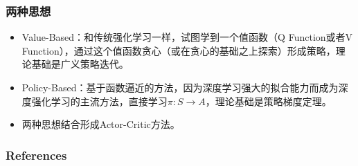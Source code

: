 \documentclass[aspectratio=169]{beamer}
\begin{document}
\begin{frame}
  \frametitle{两种思想}
  \begin{itemize}
    \item Value-Based：和传统强化学习一样，试图学到一个值函数（Q Function或者V Function），通过这个值函数贪心（或在贪心的基础之上探索）形成策略，理论基础是广义策略迭代。
    \item Policy-Based：基于函数逼近的方法，因为深度学习强大的拟合能力而成为深度强化学习的主流方法，直接学习$\pi:S \rightarrow A$，理论基础是策略梯度定理。
    \item 两种思想结合形成Actor-Critic方法。
  \end{itemize}
\end{frame}

\begin{frame}
\frametitle{References}
\printbibliography
\end{frame}
\end{document}
